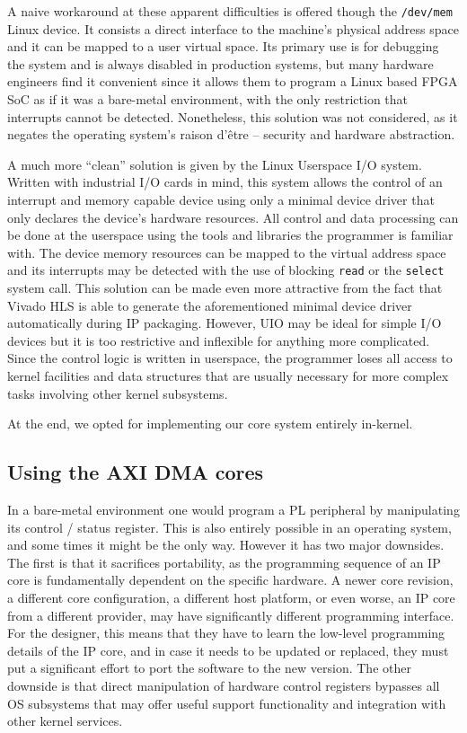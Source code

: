 A naive workaround at these apparent difficulties is offered though the \texttt{/dev/mem} Linux device. 
It consists a direct interface to the machine's physical address space and it can be mapped to a user virtual space. 
Its primary use is for debugging the system and is always disabled in production systems, but many hardware engineers
find it convenient since it allows them to program a Linux based FPGA SoC as if it was a bare-metal environment,
with the only restriction that interrupts cannot be detected. 
Nonetheless, this solution was not considered, as it negates the operating system's raison d'être --
security and hardware abstraction.

A much more ``clean'' solution is given by the Linux Userspace I/O system. Written with industrial I/O cards
in mind, this system allows the control of an interrupt and memory capable device using only
a minimal device driver that only declares the device's hardware resources. All control and data processing
can be done at the userspace using the tools and libraries the programmer is familiar with. 
The device memory resources can be mapped to the virtual address space
and its interrupts may be detected with the use of blocking \texttt{read} or the \texttt{select} system call.
This solution can be made even more attractive from the fact that Vivado HLS is able to generate
the aforementioned minimal device driver automatically during IP packaging.
However, UIO may be ideal for simple I/O devices but it is too restrictive and inflexible for anything more complicated.
Since the control logic is written in userspace, the programmer loses all access to kernel facilities
and data structures that are usually necessary for more complex tasks involving other kernel subsystems.

At the end, we opted for implementing our core system entirely in-kernel.

\subsection{Using the AXI DMA cores}

In a bare-metal environment one would program a PL peripheral by manipulating its control / status register.
This is also entirely possible in an operating system, and some times it might be the only way.
However it has two major downsides. The first is that it sacrifices portability, 
as the programming sequence of an IP core is fundamentally dependent on the specific hardware.
A newer core revision, a different core configuration, 
a different host platform, or even worse, an IP core from a different
provider, may have significantly different programming interface. For the designer, this means that
they have to learn the low-level programming details of the IP core, and in case it needs to be
updated or replaced, they must put a significant effort to port the software to the new version.
The other downside is that direct manipulation of hardware control registers bypasses all OS
subsystems that may offer useful support functionality and integration with other kernel services.

